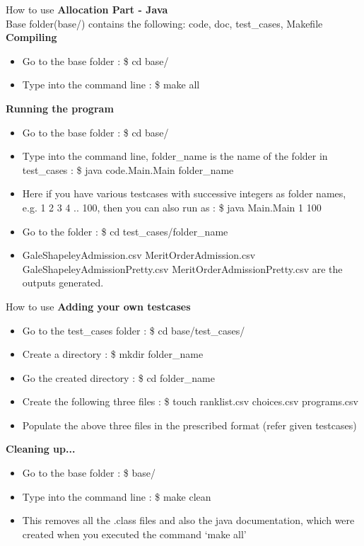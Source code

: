 \documentclass{beamer}
\begin{document}
\begin{frame}[t]{How to use}
\pause
\textbf{Allocation Part - Java}\\
\pause
Base folder(base/) contains the following: code, doc, test\_cases, Makefile\\
\pause
\textbf{Compiling}\\
\begin{itemize}[<+->]
\item Go to the base folder : \$ cd base/
\item Type into the command line : \$ make all
\end{itemize}
\pause
\textbf{Running the program}\\
\begin{itemize}[<+->]
\item Go to the base folder : \$ cd base/
\item Type into the command line, folder\_name is the name of the folder in test\_cases : \$ java code.Main.Main folder\_name
\item Here if you have various testcases with successive integers as folder names, e.g. 1 2 3 4 .. 100, then you can also run as :  \$ java Main.Main 1 100
\item Go to the folder : \$ cd test\_cases/folder\_name
\item GaleShapeleyAdmission.csv MeritOrderAdmission.csv GaleShapeleyAdmissionPretty.csv MeritOrderAdmissionPretty.csv are the outputs generated.
\end{itemize}
\end{frame}

\begin{frame}[t]{How to use}
\pause
\textbf{Adding your own testcases}\\
\begin{itemize}[<+->]
\item Go to the test\_cases folder : \$ cd base/test\_cases/
\item Create a directory : \$ mkdir folder\_name
\item Go the created directory : \$ cd folder\_name
\item Create the following three files : \$ touch ranklist.csv choices.csv programs.csv
\item Populate the above three files in the prescribed format (refer given testcases)
\end{itemize}
\pause
\textbf{Cleaning up...}\\
\begin{itemize}[<+->]
\item Go to the base folder : \$ base/
\item Type into the command line : \$ make clean
\item This removes all the .class files and also the java documentation, which were created when you executed the command `make all'
\end{itemize}
\end{frame}
\end{document}
